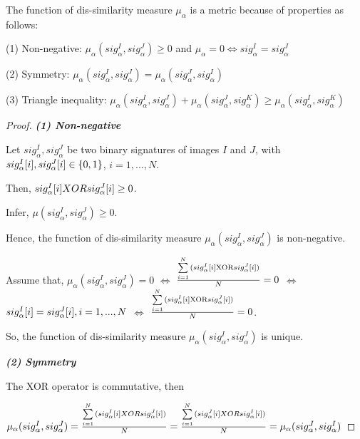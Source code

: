 \documentclass{amcs}
\begin{document}
\begin{theorem}{} The function of dis-similarity measure ${\mu _\alpha }$ is a metric because of properties as follows:

(1) Non-negative: ${\mu _\alpha }(sig_\alpha ^I,sig_\alpha ^J) \ge 0$ and ${\mu _\alpha } = 0 \Leftrightarrow sig_\alpha ^I = sig_\alpha ^J$

(2) Symmetry: ${\mu _\alpha }(sig_\alpha ^I,sig_\alpha ^J) = {\mu _\alpha }(sig_\alpha ^J,sig_\alpha ^I)$

(3) Triangle inequality: ${\mu _\alpha }(sig_\alpha ^I,sig_\alpha ^J) + {\mu _\alpha }(sig_\alpha ^J,sig_\alpha ^K) \ge {\mu _\alpha }(sig_\alpha ^I,sig_\alpha ^K)$
\label{theorem:dis-similarity}
\end{theorem}
\begin{proof}{}

\textit{\textbf{(1) Non-negative}}

Let $sig_\alpha ^I,sig_\alpha ^J$ be two binary signatures of images $I$ and $J$, with $sig_\alpha ^I{\rm{[}}i],sig_\alpha ^J{\rm{[}}i] \in \{ 0,1\} $, $i = 1,...,N$. 

Then, $sig_\alpha ^I{\rm{[}}i{\rm{] }}XOR{\rm{ }}sig_\alpha ^J[i] \ge 0$. 

Infer, $\mu (sig_\alpha ^I,sig_\alpha ^J) \ge 0$. 

Hence, the function of dis-similarity measure ${\mu _\alpha }(sig_\alpha ^I,sig_\alpha ^J)$ is non-negative. 

Assume that, ${\mu _\alpha }(sig_\alpha ^I,sig_\alpha ^J) = 0$ $ \Leftrightarrow $ $\frac{{\sum\limits_{i = 1}^N {(sig_\alpha ^I{\rm{[}}i]{\rm{ XOR }}sig_\alpha ^J{\rm{[}}i])} }}{N} = 0$ $ \Leftrightarrow $ $sig_\alpha ^I{\rm{[}}i] = sig_\alpha ^J{\rm{[}}i],i = 1,...,N$ $ \Leftrightarrow $ $\frac{{\sum\limits_{i = 1}^N {(sig_\alpha ^I{\rm{[}}i]{\rm{ XOR }}sig_\alpha ^J{\rm{[}}i])} }}{N} = 0$. 

So, the function of dis-similarity measure ${\mu _\alpha }(sig_\alpha ^I,sig_\alpha ^J)$ is unique.

\textit{\textbf{(2) Symmetry}}

The XOR operator is commutative, then 

${\mu _\alpha }(sig_\alpha ^I,sig_\alpha ^J) = \frac{{\sum\limits_{i = 1}^N {(sig_\alpha ^I{\rm{[}}i]{\rm{ }}XOR{\rm{ }}sig_\alpha ^J{\rm{[}}i])} }}{N} \\= \frac{{\sum\limits_{i = 1}^N {(sig_\alpha ^J{\rm{[}}i]{\rm{ }}XOR{\rm{ }}sig_\alpha ^I{\rm{[}}i])} }}{N} = {\mu _\alpha }(sig_\alpha ^J,sig_\alpha ^I)$


\end{proof}
\end{document}
